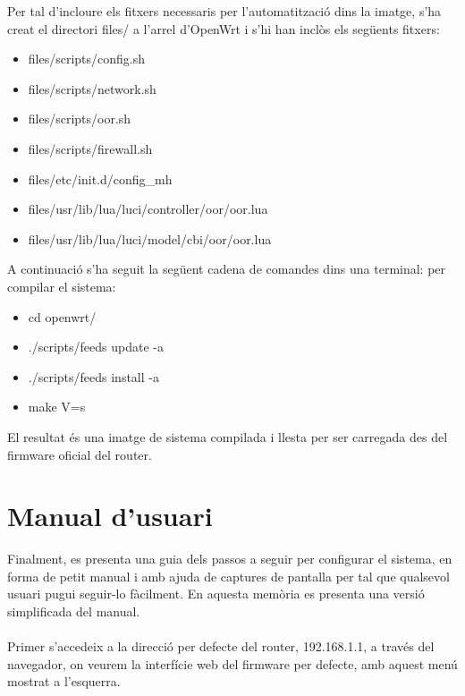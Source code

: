 \documentclass[11pt]{article}
\begin{document}
Per tal d’incloure els fitxers necessaris per l’automatització dins la imatge, s’ha creat el directori files/ a l’arrel d’OpenWrt i s’hi han inclòs els següents fitxers:
\begin{itemize}
\item files/scripts/config.sh
\item files/scripts/network.sh
\item files/scripts/oor.sh
\item files/scripts/firewall.sh
\item files/etc/init.d/config\_mh
\item files/usr/lib/lua/luci/controller/oor/oor.lua
\item files/usr/lib/lua/luci/model/cbi/oor/oor.lua
\end{itemize}
A continuació s’ha seguit la següent cadena de comandes dins una terminal: per compilar el sistema:
\begin{itemize}
\item cd openwrt/
\item ./scripts/feeds update -a
\item ./scripts/feeds install -a
\item make V=s
\end{itemize}
El resultat és una imatge de sistema compilada i llesta per ser carregada des del firmware oficial del router.
\newpage
\section{Manual d’usuari}
Finalment, es presenta una guia dels passos a seguir per configurar el sistema, en forma de petit manual i amb ajuda de captures de pantalla per tal que qualsevol usuari pugui seguir-lo fàcilment. En aquesta memòria es presenta una versió simplificada del manual.\\
\\
Primer s'accedeix a la direcció per defecte del router, 192.168.1.1, a través del navegador, on veurem la interfície web del firmware per defecte, amb aquest menú mostrat a l'esquerra.
\end{document}
